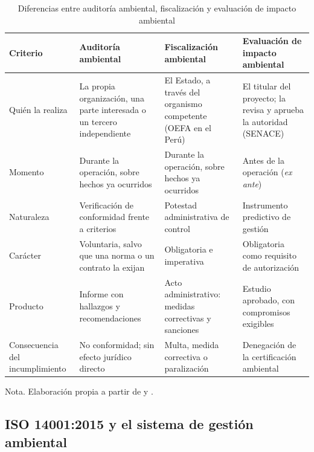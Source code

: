 \begin{table}[H]
  \centering
  \caption{Diferencias entre auditoría ambiental, fiscalización y evaluación de impacto ambiental}
  \label{tab:auditoria-vs-fiscalizacion}
  \begin{footnotesize}
  \begin{tabularx}{\textwidth}{@{}L{2.6cm} Y Y Y@{}}
    \toprule
    \textbf{Criterio} & \textbf{Auditoría ambiental} & \textbf{Fiscalización ambiental} & \textbf{Evaluación de impacto ambiental} \\
    \midrule
    Quién la realiza
      & La propia organización, una parte interesada o un tercero independiente
      & El Estado, a través del organismo competente ({OEFA} en el Perú)
      & El titular del proyecto; la revisa y aprueba la autoridad ({SENACE}) \\
    \addlinespace
    Momento
      & Durante la operación, sobre hechos ya ocurridos
      & Durante la operación, sobre hechos ya ocurridos
      & Antes de la operación (\textit{ex ante}) \\
    \addlinespace
    Naturaleza
      & Verificación de conformidad frente a criterios
      & Potestad administrativa de control
      & Instrumento predictivo de gestión \\
    \addlinespace
    Carácter
      & Voluntaria, salvo que una norma o un contrato la exijan
      & Obligatoria e imperativa
      & Obligatoria como requisito de autorización \\
    \addlinespace
    Producto
      & Informe con hallazgos y recomendaciones
      & Acto administrativo: medidas correctivas y sanciones
      & Estudio aprobado, con compromisos exigibles \\
    \addlinespace
    Consecuencia del incumplimiento
      & No conformidad; sin efecto jurídico directo
      & Multa, medida correctiva o paralización
      & Denegación de la certificación ambiental \\
    \bottomrule
  \end{tabularx}
  \end{footnotesize}
  \par\vspace{4pt}
  \raggedright\footnotesize Nota. Elaboración propia a partir de
  \textcite{iso2018iso19011} y \textcite{congreso2009ley29325,congreso2001ley27446}.
\end{table}

\subsection{ISO 14001:2015 y el sistema de gestión ambiental}

